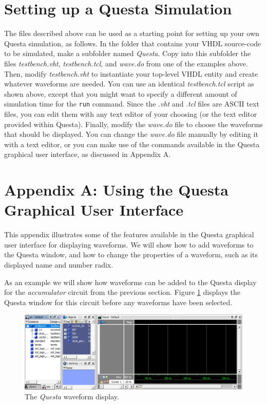 \documentclass[11pt, twoside, pdftex]{article}
\begin{document}
\section{Setting up a Questa Simulation}

The files described above can be used as a starting point for setting up your own Questa 
simulation, as follows.  In the folder that contains your VHDL source-code to be
simulated, make a subfolder named {\it Questa}. 
Copy into this subfolder the files {\it testbench.vht},
{\it testbench.tcl}, and {\it wave.do} from one of the examples above. Then, 
modify {\it testbench.vht} to instantiate your top-level VHDL entity and create whatever 
waveforms are needed. You can use an identical {\it testbench.tcl} script as shown above, 
except that you might want to specify a different amount of simulation time for 
the \texttt{run} command. Since the .{\it vht} and .{\it tcl} files are ASCII text
files, you can edit them with any text editor of your choosing (or the text editor
provided within Questa). Finally, 
modify the {\it wave.do} file to choose the waveforms that should be displayed.
You can change the {\it wave.do} file manually by editing it with a text editor, or you can 
make use of the commands available in the Questa graphical user interface, 
as discussed in Appendix A.

\newpage
\section*{Appendix A: Using the Questa Graphical User Interface}

This appendix illustrates some of the features available in the Questa graphical user
interface for displaying waveforms. We will show how to add waveforms to the Questa
window, and how to change the properties of a waveform, such as its displayed name 
and number radix.

As an example we will show how waveforms can be added to the Questa display for the
{\it accumulator} circuit from the previous section. Figure \ref{fig:appa_fig1} displays the 
Questa window for this circuit before any waveforms have been selected.

\begin{figure}[h!]
	\begin{center}
		\includegraphics[width = \textwidth]{figures/appa_fig1.png}
	\end{center}
		  \caption{The {\it Questa} waveform display.}
	\label{fig:appa_fig1}
\end{figure}
\end{document}
